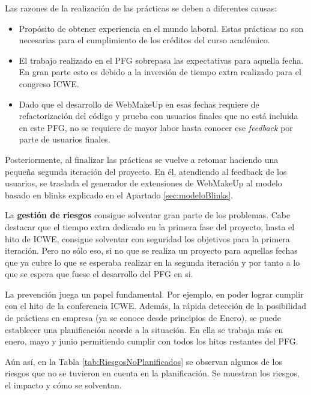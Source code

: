 Las razones de la realización de las prácticas se deben a diferentes causas:
\begin{itemize}
\item{Propósito de obtener experiencia en el mundo laboral. Estas prácticas no son necesarias para el cumplimiento de los créditos del curso académico.}
\item{El trabajo realizado en el PFG sobrepasa las expectativas para aquella fecha. En gran parte esto es debido a la inversión de tiempo extra realizado para el congreso ICWE.}
\item{Dado que el desarrollo de WebMakeUp en esas fechas requiere de refactorización del código y prueba con usuarios finales que no está incluida en este PFG, no se requiere de mayor labor hasta conocer ese \emph{feedback} por parte de usuarios finales.}
\end{itemize}

Posteriormente, al finalizar las prácticas se vuelve a retomar haciendo una pequeña segunda iteración del proyecto. En él, atendiendo al feedback de los usuarios, se traslada el generador de extensiones de WebMakeUp al modelo basado en blinks explicado en el Apartado \ref{sec:modeloBlinks}.

La \textbf{gestión de riesgos} consigue solventar gran parte de los problemas. Cabe destacar que el tiempo extra dedicado en la primera fase del proyecto, hasta el hito de ICWE, consigue solventar con seguridad los objetivos para la primera iteración. Pero no sólo eso, si no que se realiza un proyecto para aquellas fechas que ya cubre lo que se esperaba realizar en la segunda iteración y por tanto a lo que se espera que fuese el desarrollo del PFG en si.

La prevención juega un papel fundamental. Por ejemplo, en poder lograr cumplir con el hito de la conferencia ICWE. Además, la rápida detección de la posibilidad de prácticas en empresa (ya se conoce desde principios de Enero), se puede establecer una planificación acorde a la situación. En ella se trabaja más en enero, mayo y junio permitiendo cumplir con todos los hitos restantes del PFG.

Aún así, en la Tabla \ref{tab:RiesgosNoPlanificados} se observan algunos de los riesgos que no se tuvieron en cuenta en la planificación. Se muestran los riesgos, el impacto y cómo se solventan.

